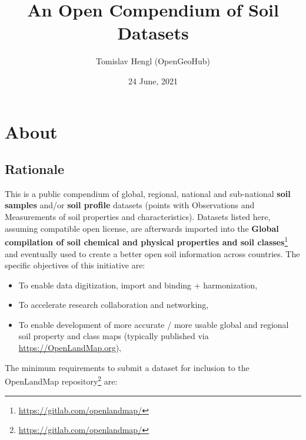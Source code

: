 \documentclass[
  graybox,natbib,nospthms]{svmono}
\title{An Open Compendium of Soil Datasets}
\author{Tomislav Hengl (OpenGeoHub)}
\date{24 June, 2021}
\providecommand{\tightlist}{%
  \setlength{\itemsep}{0pt}\setlength{\parskip}{0pt}}
\providecommand{\tightlist}{\setlength{\itemsep}{0pt}\setlength{\parskip}{0pt}}
\renewcommand{\href}[2]{#2 (\url{#1})}
\renewcommand{\href}[2]{#2\footnote{\url{#1}}}
\begin{document}
\maketitle

\thispagestyle{empty}
\begin{center}
\end{center}

\setlength{\abovedisplayskip}{-5pt}
\setlength{\abovedisplayshortskip}{-5pt}

{
\hypersetup{linkcolor=}
\setcounter{tocdepth}{1}
\tableofcontents
}
\hypertarget{about}{%
\chapter{About}\label{about}}

\hypertarget{rationale}{%
\section{Rationale}\label{rationale}}

This is a public compendium of global, regional, national and
sub-national \textbf{soil samples} and/or \textbf{soil profile} datasets (points with
Observations and Measurements of soil properties and characteristics).
Datasets listed here, assuming compatible open license, are afterwards
imported into the \href{https://gitlab.com/openlandmap/}{\textbf{Global compilation of soil chemical and physical
properties and soil classes}} and
eventually used to create a better open soil information across countries.
The specific objectives of this initiative are:

\begin{itemize}
\tightlist
\item
  To enable data digitization, import and binding + harmonization,\\
\item
  To accelerate research collaboration and networking,\\
\item
  To enable development of more accurate / more usable global and
  regional soil property and class maps (typically published via
  \url{https://OpenLandMap.org}),
\end{itemize}

The minimum requirements to submit a dataset for inclusion to \href{https://gitlab.com/openlandmap/}{the
OpenLandMap repository} are:
\end{document}
